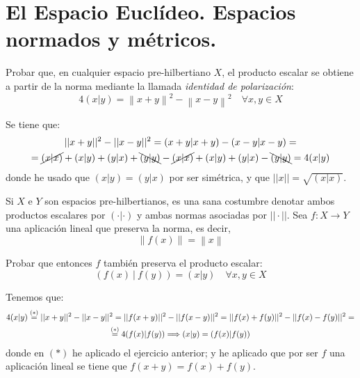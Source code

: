 \section{El Espacio Euclídeo. Espacios normados y métricos.}

\begin{ejercicio}\label{ej:Rel1_1}
    Probar que, en cualquier espacio pre-hilbertiano $X$, el producto escalar se obtiene a partir de la norma mediante la llamada \emph{identidad de polarización}:
    \begin{equation*}
        4(x|y)=\left\lVert x+y \right\rVert^{2} - \left\lVert x-y \right\rVert^{2} \quad \forall x,y \in X 
    \end{equation*}

    Se tiene que:
    \begin{multline*}
        ||x+y||^2 - ||x-y||^2 = (x+y|x+y) - (x-y|x-y) =\\=
        \cancel{(x|x)} + (x|y) + (y|x) + \bcancel{(y|y)} - \cancel{(x|x)} + (x|y) + (y|x) - \bcancel{(y|y)} = 4(x|y)
    \end{multline*}
    donde he usado que $(x|y)=(y|x)$ por ser simétrica, y que $||x||=\sqrt{(x|x)}$.
\end{ejercicio}

\begin{ejercicio}
     Si $X$ e $Y$ son espacios pre-hilbertianos, es una sana costumbre denotar ambos productos escalares por $(\cdot|\cdot)$ y ambas normas asociadas por $||\cdot ||$. Sea $f : X \to Y$ una aplicación lineal que preserva la norma, es decir,
     \begin{equation*}
        \left\lVert f(x) \right\rVert = \left\lVert x \right\rVert
    \end{equation*}

    Probar que entonces $f$ también preserva el producto escalar:
    \begin{equation*}
        \left( f(x) \ | \ f(y) \right) = (x|y) \quad \forall  x,y \in X
    \end{equation*}

    Tenemos que:
    \begin{multline*}
        4(x|y)
        \stackrel{(\ast)}{=} ||x+y||^2 - ||x-y||^2
        = ||f(x+y)||^2 - ||f(x-y)||^2
        = ||f(x)+f(y)||^2 - ||f(x)-f(y)||^2
        =\\\stackrel{(\ast)}{=} 4(f(x)|f(y)) \Longrightarrow (x|y)=(f(x)|f(y))
    \end{multline*}
    donde en $(\ast)$ he aplicado el ejercicio anterior; y he aplicado que por ser $f$ una aplicación lineal se tiene que $f(x+y)=f(x)+f(y)$.
\end{ejercicio}


